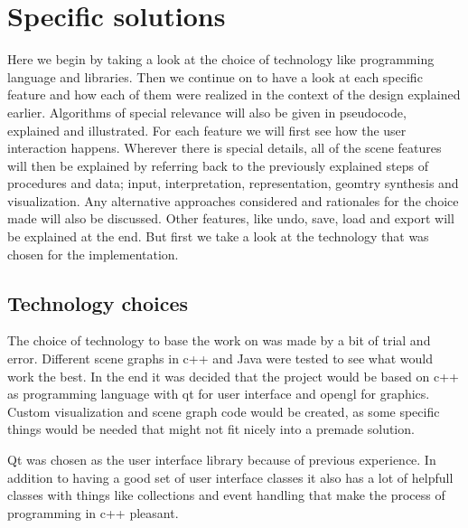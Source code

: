 \documentclass[a4paper,12pt]{report}
\begin{document}
\section{Specific solutions}
\label{subsec:indepth}

Here we begin by taking a look at the choice of technology like programming language and libraries. Then we continue on to have a look at each specific feature and how each of them were realized in the context of the design explained earlier. Algorithms of special relevance will also be given in pseudocode, explained and illustrated. For each feature we will first see how the user interaction happens. Wherever there is special details, all of the scene features will then be explained by referring back to the previously explained steps of procedures and data; input, interpretation, representation, geomtry synthesis and visualization. Any alternative approaches considered and rationales for the choice made will also be discussed. Other features, like undo, save, load and export will be explained at the end. But first we take a look at the technology that was chosen for the implementation.

\subsection{Technology choices}
The choice of technology to base the work on was made by a bit of trial and error. Different scene graphs in c++ and Java were tested to see what would work the best. In the end it was decided that the project would be based on c++ as programming language with qt for user interface and opengl for graphics. Custom visualization and scene graph code would be created, as some specific things would be needed that might not fit nicely into a premade solution. 

Qt was chosen as the user interface library because of previous experience. In addition to having a good set of user interface classes it also has a lot of helpfull classes with things like collections and event handling that make the process of programming in c++ pleasant.
\end{document}
